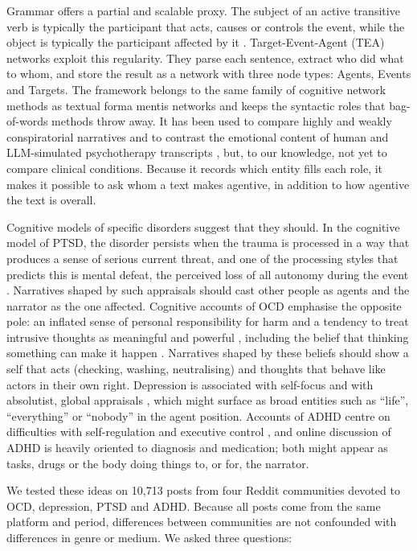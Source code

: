 \documentclass[11pt,a4paper]{article}
\begin{document}
Grammar offers a partial and scalable proxy. The subject of an active transitive verb is typically the participant that acts, causes or controls the event, while the object is typically the participant affected by it \citep{dowty1991}. Target-Event-Agent (TEA) networks \citep{franchini2026tea} exploit this regularity. They parse each sentence, extract who did what to whom, and store the result as a network with three node types: Agents, Events and Targets. The framework belongs to the same family of cognitive network methods as textual forma mentis networks \citep{stella2020} and keeps the syntactic roles that bag-of-words methods throw away. It has been used to compare highly and weakly conspiratorial narratives and to contrast the emotional content of human and LLM-simulated psychotherapy transcripts \citep{franchini2026tea}, but, to our knowledge, not yet to compare clinical conditions. Because it records which entity fills each role, it makes it possible to ask whom a text makes agentive, in addition to how agentive the text is overall.

Cognitive models of specific disorders suggest that they should. In the cognitive model of PTSD, the disorder persists when the trauma is processed in a way that produces a sense of serious current threat, and one of the processing styles that predicts this is mental defeat, the perceived loss of all autonomy during the event \citep{ehlers2000}. Narratives shaped by such appraisals should cast other people as agents and the narrator as the one affected. Cognitive accounts of OCD emphasise the opposite pole: an inflated sense of personal responsibility for harm \citep{salkovskis1985} and a tendency to treat intrusive thoughts as meaningful and powerful \citep{rachman1997}, including the belief that thinking something can make it happen \citep{shafran1996}. Narratives shaped by these beliefs should show a self that acts (checking, washing, neutralising) and thoughts that behave like actors in their own right. Depression is associated with self-focus and with absolutist, global appraisals \citep{tackman2019,almosaiwi2018}, which might surface as broad entities such as ``life'', ``everything'' or ``nobody'' in the agent position. Accounts of ADHD centre on difficulties with self-regulation and executive control \citep{barkley1997}, and online discussion of ADHD is heavily oriented to diagnosis and medication; both might appear as tasks, drugs or the body doing things to, or for, the narrator.

We tested these ideas on 10,713 posts from four Reddit communities devoted to OCD, depression, PTSD and ADHD. Because all posts come from the same platform and period, differences between communities are not confounded with differences in genre or medium. We asked three questions:
\end{document}
